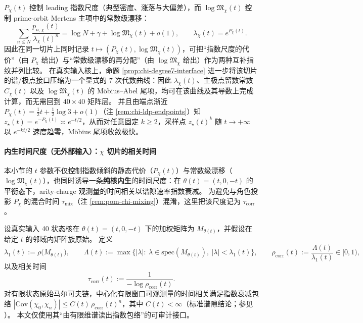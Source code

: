 \begin{remark}
$P_\chi(t)$ 控制 leading 指数尺度（典型密度、涨落与大偏差），而 $\log\mathfrak{M}_\chi(t)$ 控制 prime-orbit Mertens 主项中的常数级漂移：
\[
\sum_{n\le N}\frac{p_{n,\chi}(t)}{\lambda_\chi(t)^n}=\log N+\gamma+\log\mathfrak{M}_\chi(t)+o(1),
\qquad
\lambda_\chi(t)=e^{P_\chi(t)}.
\]
因此在同一切片上同时记录 $t\mapsto(P_\chi(t),\log\mathfrak{M}_\chi(t))$，可把“指数尺度的代价”（由 $P_\chi$ 给出）与“常数级漂移的再分配”（由 $\log\mathfrak{M}_\chi$ 给出）作为两种互补指纹并列比较。
在真实输入核上，命题 \ref{prop:chi-degree7-interface} 进一步将该切片的谱/极点接口压缩为一个显式的 \(7\) 次代数曲线：因此 \(\lambda_\chi(t)\)、主极点留数常数 \(C_\chi(t)\) 以及 \(\log\mathfrak{M}_\chi(t)\) 的 Möbius--Abel 尾项，均可在该曲线及其导数上完成计算，而无需回到 \(40\times 40\) 矩阵层。
并且由端点渐近 \(P_\chi(t)=\tfrac12t+\tfrac12\log 3+o(1)\)（注 \ref{rem:chi-ldp-endpoints}）知 \(z_\star(t)=e^{-P_\chi(t)}\asymp e^{-t/2}\)，从而对任意固定 \(k\ge 2\)，采样点 \(z_\star(t)^k\) 随 \(t\to+\infty\) 以 \(e^{-kt/2}\) 速度趋零，Möbius 尾项收敛极快。
\end{remark}

\paragraph{内生时间尺度（无外部输入）：\texorpdfstring{$\chi$}{chi} 切片的相关时间}
本小节的 $t$ 参数不仅控制指数倾斜的静态代价（$P_\chi(t)$）与常数级漂移（$\log\mathfrak{M}_\chi(t)$），也同时诱导一条\textbf{纯核内生}的时间尺度：在 $\theta(t)=(t,0,-t)$ 的平衡态下，arity-charge 观测量的时间相关以谱隙速率指数衰减。
为避免与角色投影 $P_\chi$ 的混合时间 $\tau_{\mathrm{mix}}$（注 \ref{rem:pom-chi-mixing}）混淆，这里把该尺度记为 $\tau_{\mathrm{corr}}$。

\begin{remark}\label{prop:chi-slice-time-correlation}
设真实输入 40 状态核在 $\theta(t)=(t,0,-t)$ 下的加权矩阵为 $M_{\theta(t)}$，并假设在给定 $t$ 的邻域内矩阵族原始。
定义
\[
\lambda_1(t):=\rho\bigl(M_{\theta(t)}\bigr),
\qquad
\Lambda(t):=\max\{ |\lambda|:\ \lambda\in\mathrm{spec}(M_{\theta(t)}),\ |\lambda|<\lambda_1(t)\},
\qquad
\rho_{\mathrm{corr}}(t):=\frac{\Lambda(t)}{\lambda_1(t)}\in[0,1),
\]
以及相关时间
\[
\tau_{\mathrm{corr}}(t):=\frac{1}{-\log \rho_{\mathrm{corr}}(t)}.
\]
对有限状态原始马尔可夫链，中心化有限窗口可观测量的时间相关满足指数衰减包络
\(
|\mathrm{Cov}(\chi_0,\chi_n)|\le C(t)\,\rho_{\mathrm{corr}}(t)^n
\)，其中 $C(t)<\infty$（标准谱隙结论；参见 \cite{LevinPeresWilmer2009MarkovMixing}）。
本文仅使用其“由有限维谱读出指数包络”的可审计接口。
\end{remark}

